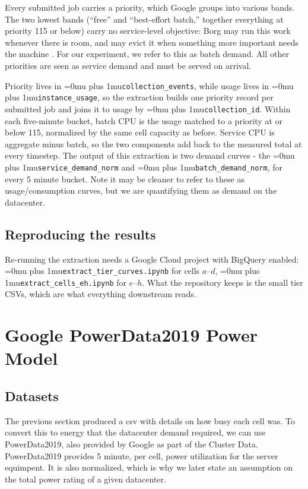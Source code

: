 \documentclass[12pt]{article}
\newcommand{\codepath}[1]{{\Urlmuskip=0mu plus 1mu\relax\nolinkurl{#1}}}
\begin{document}
Every submitted job carries a priority, which Google groups into various bands. The two lowest bands (``free'' and ``best-effort batch,'' together everything at priority 115 or below) carry no service-level objective: Borg may run this work whenever there is room, and may evict it when something more important needs the machine \cite{googleClusterAnalysisColab}. For our experiment, we refer to this as batch demand. All other priorities are seen as service demand and must be served on arrival.

Priority lives in \codepath{collection_events}, while usage lives in \codepath{instance_usage}, so the extraction builds one priority record per submitted job and joins it to usage by \codepath{collection_id}. Within each five-minute bucket, batch CPU is the usage matched to a priority at or below 115, normalized by the same cell capacity as before. Service CPU is aggregate minus batch, so the two components add back to the measured total at every timestep. The output of this extraction is two demand curves - the \codepath{service_demand_norm} and \codepath{batch_demand_norm}, for every 5 minute bucket. Note it may be cleaner to refer to these as usage/consumption curves, but we are quantifying them as demand on the datacenter.

\subsection{Reproducing the results}
\label{subsec:clusterdata-artifacts}

Re-running the extraction needs a Google Cloud project with BigQuery  enabled: \codepath{extract_tier_curves.ipynb} for cells \(a\)--\(d\), \codepath{extract_cells_eh.ipynb} for \(e\)--\(h\). What the repository keeps is the small tier CSVs, which are what everything downstream reads. 

\section{Google PowerData2019 Power Model}
\label{sec:powerdata2019}

\subsection{Datasets}
\label{subsec:powerdata-purpose}

The previous section produced a csv with details on how busy each cell was. To convert this to energy that the datacenter demand required, we can use PowerData2019, also provided by Google as part of the Cluster Data. PowerData2019 provides 5 minute, per cell, power utilization for the server equimpent. It is also normalized, which is why we later state an assumption on the total power rating of a given datacenter.
\end{document}
